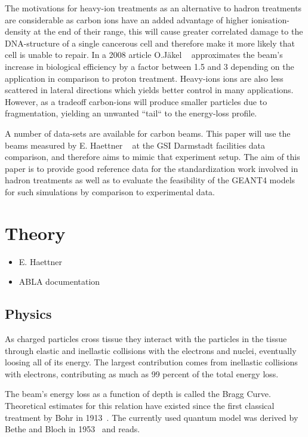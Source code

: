 The motivations for heavy-ion treatments as an alternative to hadron treatments are considerable as carbon ions have an added advantage of higher ionisation-density at the end of their range, this will cause greater correlated damage to the DNA-structure of a single cancerous cell and therefore make it more likely that cell is unable to repair. In a 2008 article O.Jäkel ~\cite{ojakel}  approximates the beam's increase in biological efficiency by a factor between 1.5 and 3 depending on the application in comparison to proton treatment. Heavy-ions ions are also less scattered in lateral directions which yields better control in many applications. However, as a tradeoff carbon-ions will produce smaller particles due to fragmentation, yielding an unwanted ``tail`` to the energy-loss profile.

A number of data-sets are available for carbon beams. This paper will use the beams measured by E. Haettner ~\cite{ehaettner}  at the GSI Darmstadt facilities data comparison, and therefore aims to mimic that experiment setup. The aim of this paper is  to provide good reference data for the standardization work involved in hadron treatments as well as to evaluate the feasibility of the GEANT4 models for such simulations by comparison to experimental data.

\section{Theory}
\begin{itemize}
 \item E. Haettner
 \item ABLA documentation
\end{itemize}
\subsection{Physics}
As charged particles cross tissue they interact with the particles in the tissue through elastic and inellastic collisions with the electrons and nuclei, eventually loosing all of its energy. The largest contribution comes from inellastic collisions with electrons, contributing as much as 99 percent of the total energy loss.

The beam's energy loss as a function of depth is called the Bragg Curve. Theoretical estimates for this relation have existed since the first classical treatment by Bohr in 1913~\cite{bohr13}. The currently used quantum model was derived by Bethe and Bloch in 1953~\cite{bethebloch} and reads. 

